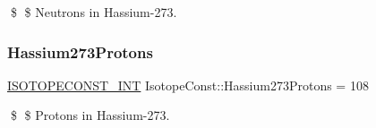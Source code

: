 \$ \$ Neutrons in Hassium-\/273. \mbox{\label{group___isotope_const-_hassium-_hs273_ga9a9b3c0b01b787dc93f419023a1d61af}} 
\subsubsection{\texorpdfstring{Hassium273\+Protons}{Hassium273Protons}}
{\footnotesize\ttfamily \mbox{\hyperlink{group___isotope_const-_macros_ga5f18360b3e99483a35c32d789e62621c}{I\+S\+O\+T\+O\+P\+E\+C\+O\+N\+S\+T\+\_\+\+I\+NT}} Isotope\+Const\+::\+Hassium273\+Protons = 108}

\$ \$ Protons in Hassium-\/273. 